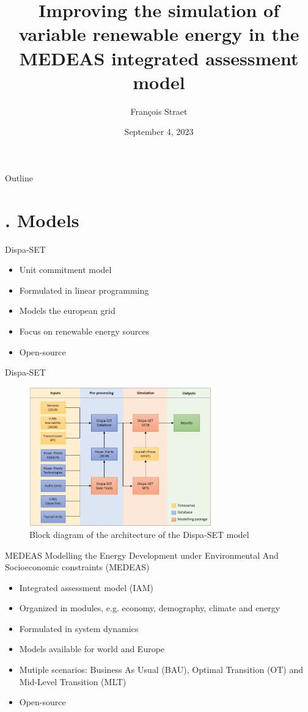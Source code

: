 \documentclass{beamer}
\title{Improving the simulation of variable renewable energy in the MEDEAS integrated assessment model}
\date{September 4, 2023}
\author{François Straet}
\institute{University of Liège - School of Engineering and Computer Science}
\newcommand{\mysection}[1]{\section{\thesection. #1}}
\begin{document}
    \maketitle

    \begin{frame}{Outline}
        \tableofcontents        
    \end{frame}

    \mysection{Models}
    \begin{frame}{Dispa-SET}
        \begin{itemize}
            \item Unit commitment model
            \item Formulated in linear programming
            \item Models the european grid
            \item Focus on renewable energy sources
            \item Open-source
        \end{itemize}

    \end{frame}

    \begin{frame}{Dispa-SET}
        \begin{figure}
            \centering
            \includegraphics[width=0.7\textwidth]{../resources/images/dispaset-architecture.png}
            \caption{Block diagram of the architecture of the Dispa-SET model}
        \end{figure}
    \end{frame}

    \begin{frame}{MEDEAS}
        Modelling the Energy Development under Environmental And Socioeconomic constraints (MEDEAS)
        \begin{itemize}
            \item Integrated assessment model (IAM)
            \item Organized in modules, e.g. economy, demography, climate and energy
            \item Formulated in system dynamics
            \item Models available for world and Europe
            \item Mutiple scenarios: Business As Usual (BAU), Optimal Transition (OT) and Mid-Level Transition (MLT)
            \item Open-source
        \end{itemize}
    \end{frame}
\end{document}
